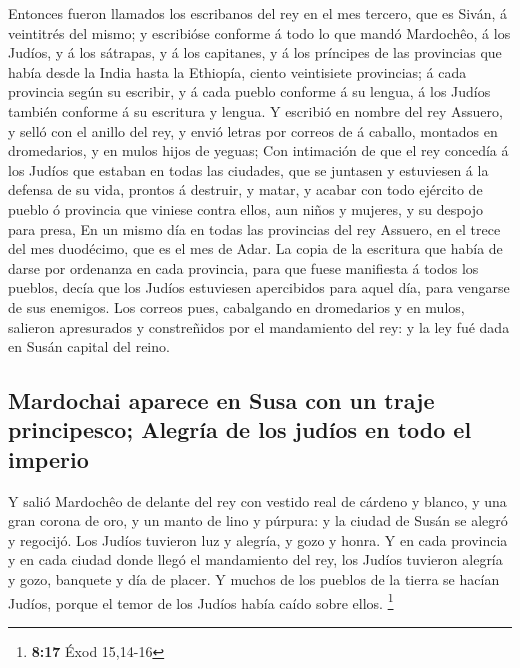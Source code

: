  Entonces fueron llamados los escribanos del rey en el mes
tercero, que es Siván, á veintitrés del mismo; y escribióse conforme á
todo lo que mandó Mardochêo, á los Judíos, y á los sátrapas, y á los
capitanes, y á los príncipes de las provincias que había desde la India
hasta la Ethiopía, ciento veintisiete provincias; á cada provincia según
su escribir, y á cada pueblo conforme á su lengua, á los Judíos también
conforme á su escritura y lengua.  Y escribió en nombre del
rey Assuero, y selló con el anillo del rey, y envió letras por correos
de á caballo, montados en dromedarios, y en mulos hijos de yeguas;
 Con intimación de que el rey concedía á los Judíos que
estaban en todas las ciudades, que se juntasen y estuviesen á la defensa
de su vida, prontos á destruir, y matar, y acabar con todo ejército de
pueblo ó provincia que viniese contra ellos, aun niños y mujeres, y su
despojo para presa,  En un mismo día en todas las
provincias del rey Assuero, en el trece del mes duodécimo, que es el mes
de Adar.  La copia de la escritura que había de darse por
ordenanza en cada provincia, para que fuese manifiesta á todos los
pueblos, decía que los Judíos estuviesen apercibidos para aquel día,
para vengarse de sus enemigos.  Los correos pues,
cabalgando en dromedarios y en mulos, salieron apresurados y
constreñidos por el mandamiento del rey: y la ley fué dada en Susán
capital del reino.

\hypertarget{mardochai-aparece-en-susa-con-un-traje-principesco-alegruxeda-de-los-juduxedos-en-todo-el-imperio}{%
\subsection{Mardochai aparece en Susa con un traje principesco; Alegría
de los judíos en todo el
imperio}\label{mardochai-aparece-en-susa-con-un-traje-principesco-alegruxeda-de-los-juduxedos-en-todo-el-imperio}}

 Y salió Mardochêo de delante del rey con vestido real de
cárdeno y blanco, y una gran corona de oro, y un manto de lino y
púrpura: y la ciudad de Susán se alegró y regocijó.  Los
Judíos tuvieron luz y alegría, y gozo y honra.  Y en cada
provincia y en cada ciudad donde llegó el mandamiento del rey, los
Judíos tuvieron alegría y gozo, banquete y día de placer. Y muchos de
los pueblos de la tierra se hacían Judíos, porque el temor de los Judíos
había caído sobre ellos. \footnote{\textbf{8:17} Éxod 15,14-16}

